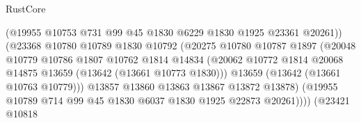 \begin{lexlean}{RustCore}
\begin{coremodule}
                                      (@19955
                                        @10753
                                        @731
                                        @99
                                        @45
                                        @1830
                                        @6229
                                        @1830
                                        @1925
                                        @23361
                                        @20261))
                                    (@23368
                                      @10780
                                      @10789
                                      @1830
                                      @10792
                                      (@20275
                                        @10780
                                        @10787
                                        @1897
                                        (@20048
                                          @10779
                                          @10786
                                          @1807
                                          @10762
                                          @1814
                                          @14834
                                          (@20062
                                            @10772
                                            @1814
                                            @20068
                                            @14875
                                            @13659
                                            (@13642 (@13661 @10773 @1830)))
                                          @13659
                                          (@13642 (@13661 @10763 @10779)))
                                        @13857
                                        @13860
                                        @13863
                                        @13867
                                        @13872
                                        @13878)
                                      (@19955
                                        @10789
                                        @714
                                        @99
                                        @45
                                        @1830
                                        @6037
                                        @1830
                                        @1925
                                        @22873
                                        @20261))))
                                (@23421
                                  @10818

\end{coremodule}
\end{lexlean}
